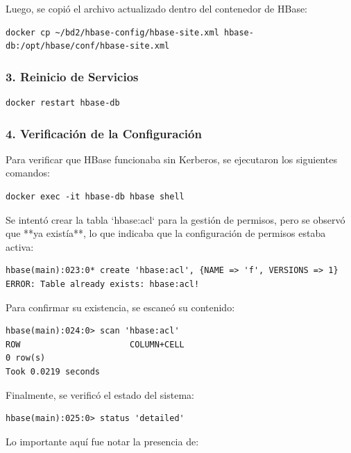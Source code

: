 \documentclass{article}
\begin{document}
Luego, se copió el archivo actualizado dentro del contenedor de HBase:

\begin{lstlisting}[style=bashStyle]
docker cp ~/bd2/hbase-config/hbase-site.xml hbase-db:/opt/hbase/conf/hbase-site.xml
\end{lstlisting}


\subsubsection{3. Reinicio de Servicios}

\begin{lstlisting}[style=bashStyle]
docker restart hbase-db
\end{lstlisting}


\subsubsection{4. Verificación de la Configuración}

Para verificar que HBase funcionaba sin Kerberos, se ejecutaron los siguientes comandos:

\begin{lstlisting}[style=bashStyle]
docker exec -it hbase-db hbase shell
\end{lstlisting}

Se intentó crear la tabla `hbase:acl` para la gestión de permisos, pero se observó que **ya existía**, lo que indicaba que la configuración de permisos estaba activa:

\begin{lstlisting}[style=bashStyle]
hbase(main):023:0* create 'hbase:acl', {NAME => 'f', VERSIONS => 1}
ERROR: Table already exists: hbase:acl!
\end{lstlisting}

Para confirmar su existencia, se escaneó su contenido:

\begin{lstlisting}[style=bashStyle]
hbase(main):024:0> scan 'hbase:acl'
ROW                      COLUMN+CELL
0 row(s)
Took 0.0219 seconds
\end{lstlisting}

Finalmente, se verificó el estado del sistema:

\begin{lstlisting}[style=bashStyle]
hbase(main):025:0> status 'detailed'
\end{lstlisting}

Lo importante aquí fue notar la presencia de:
\end{document}
